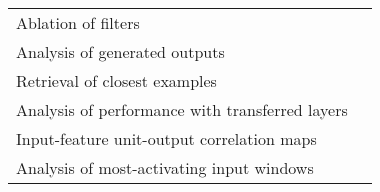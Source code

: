 \begin{tabular}{ll}
Ablation of filters                                    &                                                                                                                                                                                \cite{Lawhern2018} \\
Analysis of generated outputs                          &                                                                                                                                                                               \cite{Hartmann2018} \\
Retrieval of closest examples                          &                                                                                                                                                                                  \cite{Deiss2018} \\
Analysis of performance with transferred layers        &                                                                                                                                                                            \cite{Hajinoroozi2017} \\
Input-feature unit-output correlation maps             &                                                                                                                                                                          \cite{Schirrmeister2017} \\
Analysis of most-activating input windows              &                                                                                                                                                                              \cite{Hartmann2018b} \\
\bottomrule
\end{tabular}

